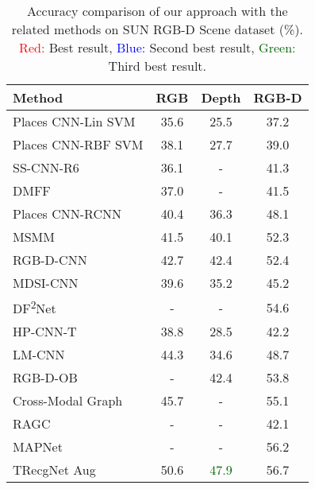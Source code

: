 \begin{table}[!h]
	\caption{Accuracy comparison of our approach with the related methods on SUN RGB-D Scene dataset (\%). \textcolor{red}{Red:} Best result, \textcolor{blue}{Blue:} Second best result, \textcolor{darkgreen}{Green:} Third best result.}
	\begin{center}
		\setlength{\tabcolsep}{0.9em} \def\arraystretch{1.2}
		\begin{adjustbox}{width=\columnwidth}
			\begin{tabular}{ lccc }
				\hline
				Method 											& RGB 				& Depth 			& RGB-D \\ \hline \hline
				Places CNN-Lin SVM \citep{Zhou_NIPS_2014}    	& 35.6 				& 25.5 	 			& 37.2 		\\ Places CNN-RBF SVM \citep{Zhou_NIPS_2014}    	& 38.1 				& 27.7 	 			& 39.0 		\\ SS-CNN-R6 \citep{Liao_ICRA_2016}    			& 36.1 				& - 	 			& 41.3 		\\ DMFF \citep{Zhu_CVPR_2016}    					& 37.0  			& - 				& 41.5 		\\ Places CNN-RCNN \citep{Wang_CVPR_2016}         	& 40.4 	           	& 36.3 	        	& 48.1 		\\ MSMM \citep{Song_IJCAI_2017}         			& 41.5 	           	& 40.1 	        	& 52.3 		\\ RGB-D-CNN \citep{Song_AAAI_2017}         		& 42.7 	           	& 42.4 	        	& 52.4 		\\ MDSI-CNN \citep{Asif_TPAMI_2018}         		& 39.6 	           	& 35.2 	        	& 45.2 		\\ DF\textsuperscript{2}Net \citep{Li_AAAI_2018df} & - 	           	& - 	        	& 54.6 		\\ HP-CNN-T \citep{Zaki_AuotRobots_2019}         	& 38.8 	           	& 28.5 	        	& 42.2 		\\ LM-CNN \citep{2019_CogComp_Cai}         		& 44.3 	           	& 34.6 	        	& 48.7 		\\ RGB-D-OB \citep{Song_TIP_2019}         			& - 	           	& 42.4 	        	& 53.8 		\\ Cross-Modal Graph \citep{Yuan_2019_AAAI}        & 45.7 	           	& - 	        	& 55.1		\\
				RAGC \citep{Montoro_2019_ICCV} 					& - 	           	& - 	        	& 42.1 		\\ MAPNet \citep{2019_PR_Li} 						& - 	           	& - 	        	& 56.2 		\\ TRecgNet Aug \citep{Du_2019_CVPR}         		& 50.6 				& \bftab\textcolor{darkgreen}{47.9} 	& 56.7 		\\

\end{tabular}
\end{adjustbox}
\end{center}
\end{table}
